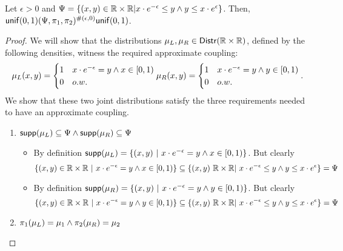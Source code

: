 \documentclass[a4paper,11pt]{article}
\begin{document}
\begin{thm}
\label{coup_unif}
Let $\epsilon>0$ and $\Psi = \{(x,y) \in \mathbb{R} \times \mathbb{R} | x \cdot e^{-\epsilon} \leq y \land  y \leq x \cdot e^{\epsilon} \}$.  Then, $ \mathsf{unif}(0,1) (\Psi,\pi_1,\pi_2)^{\#(\epsilon, 0)}  \mathsf{unif}(0,1)$.
\end{thm}
\begin{proof}
  We will show that the distributions $\mu_L, \mu_R \in \mathsf{Distr}(\mathbb{R} \times \mathbb{R})$, defined by the  following densities, witness the required approximate coupling:
\[
	{\mu_L}(x, y) = 
	\begin{cases}
	1 & x \cdot e^{-\epsilon} = y \land x \in [0, 1)\\
	0       & o.w.
	\end{cases}
	\\
	{\mu_R}(x, y) = 
	\begin{cases}
	1 & x \cdot e^{-\epsilon} = y \land y \in [0, 1)\\
	0       & o.w.
	\end{cases}.
\]
We show that these two joint distributions satisfy the three
requirements needed to have an approximate coupling.
\begin{enumerate}
	\item $\mathsf{supp}(\mu_L) \subseteq \Psi \land \mathsf{supp}(\mu_R) \subseteq \Psi$

	\begin{itemize}
        \item By
          definition $\supp(\mu_L) = \{(x,y)\ |\ x\cdot
          e^{-\epsilon}=y\land x\in [0,1)\}$. But clearly
          $$\{(x,y)\in \mathbb{R}\times \mathbb{R} \ |\ x\cdot e^{-\epsilon}=y\land x\in [0,1)\}
          \subseteq
           \{(x,y)\ \mathbb{R} \times \mathbb{R} |\ x\cdot e^{-\epsilon}\leq y\land  y\leq x\cdot e^{\epsilon}\}=\Psi
$$          

		\item By
          definition $\supp(\mu_R) = \{(x,y)\ |\ x\cdot
          e^{-\epsilon}=y\land y\in [0,1)\}$. But clearly
          $$\{(x,y)\in \mathbb{R}\times \mathbb{R} \ |\ x\cdot e^{-\epsilon}=y\land y\in [0,1)\}
          \subseteq
           \{(x,y)\ \mathbb{R} \times \mathbb{R} |\ x\cdot e^{-\epsilon}\leq y\land  y\leq x\cdot e^{\epsilon}\}=\Psi
$$          
	\end{itemize}		


	\item $\pi_1(\mu_L) = \mu_1 \land \pi_2(\mu_R) = \mu_2$
	

\end{enumerate}
\end{proof}
\end{document}

